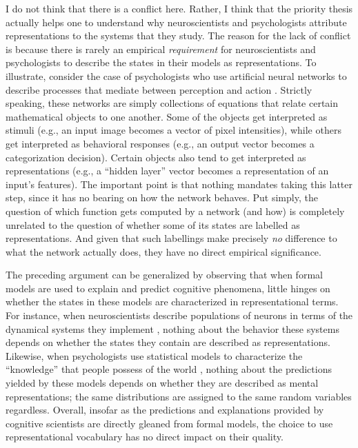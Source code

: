 I do not think that there is a conflict here. Rather, I think that the priority thesis actually helps one to understand why neuroscientists and psychologists attribute representations to the systems that they study. The reason for the lack of conflict is because there is rarely an empirical \textit{requirement} for neuroscientists and psychologists to describe the states in their models as representations. To illustrate, consider the case of psychologists who use artificial neural networks to describe processes that mediate between perception and action \citep[e.g.,][]{SmolenskyLegendre:2006,McClelland:2010,Elman:1990,Elman:1991}. Strictly speaking, these networks are simply collections of equations that relate certain mathematical objects to one another. Some of the objects get interpreted as stimuli (e.g., an input image becomes a vector of pixel intensities), while others get interpreted as behavioral responses (e.g., an output vector becomes a categorization decision). Certain objects also tend to get interpreted as representations (e.g., a ``hidden layer'' vector becomes a representation of an input's features). The important point is that nothing mandates taking this latter step, since it has no bearing on how the network behaves. Put simply, the question of which function gets computed by a network (and how) is completely unrelated to the question of whether some of its states are labelled as representations. And given that such labellings make precisely \textit{no} difference to what the network actually does, they have no direct empirical significance. 

The preceding argument can be generalized by observing that when formal models are used to explain and predict cognitive phenomena, little hinges on whether the states in these models are characterized in representational terms. For instance, when neuroscientists describe populations of neurons in terms of the dynamical systems they implement \citep[e.g., oscillators, point attractors, line attractors, etc.][]{EliasmithAnderson:2003}, nothing about the behavior these systems depends on whether the states they contain are described as representations. Likewise, when psychologists use statistical models to characterize the ``knowledge'' that people possess of the world \citep[e.g.,][]{Goodman:2015}, nothing about the predictions yielded by these models depends on whether they are described as mental representations; the same distributions are assigned to the same random variables regardless. Overall, insofar as the predictions and explanations provided by cognitive scientists are directly gleaned from formal models, the choice to use representational vocabulary has no direct impact on their quality. 


